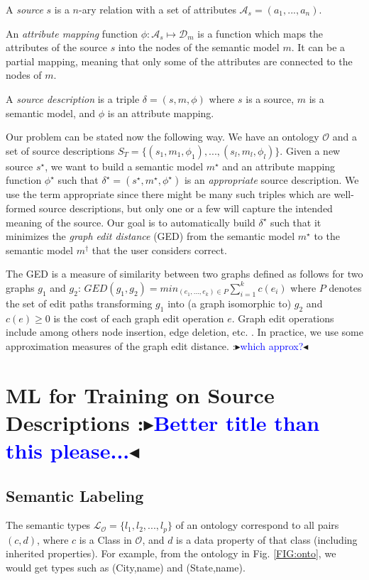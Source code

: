 \documentclass[letterpaper]{article} %
\newcommand{\authornote}[3]{
  {\fbox{\sc 
  #1}:$\blacktriangleright$\textcolor{#2}{\small{#3}}$\blacktriangleleft$}%
}
\newcommand{\ddg}[1]{\authornote{DDG}{blue}{#1}}
\begin{document}
A \emph{source} $s$ is a $n$-ary relation with a set of attributes 
$\mathcal{A}_s = 
(a_1,...,a_n)$.

An \emph{attribute mapping} function $\phi : \mathcal{A}_s \mapsto 
\mathcal{D}_m$ is a function which
maps the attributes of the source $s$ into the nodes of the semantic model $m$. 
It can be a partial mapping, meaning that only some of the attributes
are connected to the nodes of $m$.

A \emph{source description} is a triple $\delta = (s, m, \phi)$ where $s$ is a 
source, 
$m$ is a semantic
model, and $\phi$ is an attribute mapping.

Our problem can be stated now the following way. We have an ontology 
$\mathcal{O}$ and a set of source descriptions $S_T = \{(s_1, m_1, \phi_1),..., 
(s_l, m_l, \phi_l)\}$.
Given a new source $s^\star$, we want to build a semantic model $m^\star$ and 
an attribute mapping function $\phi^\star$ such that 
$\delta^\star = (s^\star,m^\star,\phi^\star)$ is an \emph{appropriate} source 
description. We
use the term appropriate since there might be many such triples which are
well-formed source descriptions, but only one or a few will capture the intended
meaning of the source. Our goal is to automatically build $\delta^\star$ such 
that it minimizes the \emph{graph edit distance} (GED) from the semantic model 
$m^\star$ to the semantic model $m^\dag$ that the user considers correct.

The GED is a measure of similarity between two graphs defined as follows for 
two graphs $g_1$ and $g_2$: $GED(g_1,g_2) = min_{(e_1 ,...,e_k)\in P} 
\sum_{i=1}^{k}c(e_i)$ where $P$ denotes the set of edit paths transforming 
$g_1$ into (a graph
isomorphic to) $g_2$ and $c(e) \geq 0$ is the cost of each graph edit operation 
$e$. Graph edit operations include among others node insertion, edge deletion, 
etc. \cite{gao2010survey}. In practice, we use some approximation measures of 
the graph edit distance. \ddg{which approx?}

\section{ML for Training on Source Descriptions \label{SEC:ML}\ddg{Better title 
than this 
please...}}


\subsection{Semantic Labeling}
The semantic types $\mathcal{L_O} = \{l_1, l_2, ..., l_p\}$ of an ontology 
correspond to all pairs $(c,d)$, where $c$ is a Class in $\mathcal{O}$, and $d$ 
is a data property of that class (including inherited properties). 
For example, from the ontology in Fig. \ref{FIG:onto}, we would get types such 
as 
(City,name) and (State,name).
\end{document}
